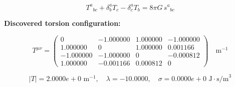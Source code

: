 
\begin{equation}
  T^a{}_{bc} + \delta^a_b T_c - \delta^a_c T_b = 8\pi G \, s^a{}_{bc}
\end{equation}

\textbf{Discovered torsion configuration:}

\begin{equation}
  T^{\mu\nu} = \begin{pmatrix}
    0 & -1.000000 & 1.000000 & -1.000000 \\
    1.000000 & 0 & 1.000000 & 0.001166 \\
    -1.000000 & -1.000000 & 0 & -0.000812 \\
    1.000000 & -0.001166 & 0.000812 & 0
  \end{pmatrix} \quad \text{m}^{-1}
\end{equation}

\begin{equation}
  |T| = 2.0000e+0 \text{ m}^{-1}, \quad
  \lambda = -10.0000, \quad
  \sigma = 0.0000e+0 \text{ J}\cdot\text{s/m}^3
\end{equation}
